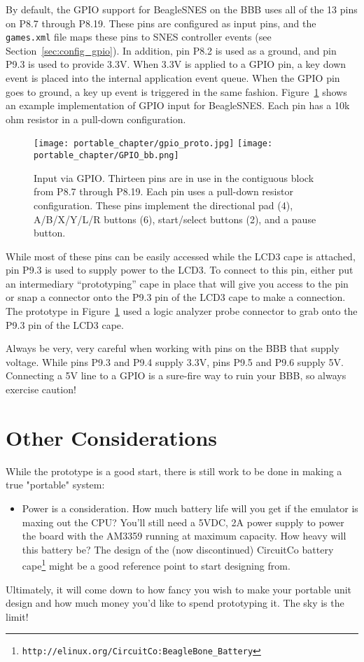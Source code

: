 By default, the GPIO support for BeagleSNES on the BBB uses all of the 13 pins on P8.7 through P8.19.  These pins are configured as input pins, and the \texttt{games.xml} file maps these pins to SNES controller events (see Section~\ref{sec:config_gpio}).  In addition, pin P8.2 is used as a ground, and pin P9.3 is used to provide 3.3V. When 3.3V is applied to a GPIO pin, a key down event is placed into the internal application event queue.  When the GPIO pin goes to ground, a key up event is triggered in the same fashion. Figure~\ref{fig:gpio_proto} shows an example implementation of GPIO input for BeagleSNES.  Each pin has a 10k ohm resistor in a pull-down configuration.

 \begin{figure}[h]
\centering\texttt{[image: portable\_chapter/gpio\_proto.jpg]}
\texttt{[image: portable\_chapter/GPIO\_bb.png]}
\caption{Input via GPIO. Thirteen pins are in use in the contiguous block from P8.7 through P8.19. Each pin uses a pull-down resistor configuration. These pins implement the directional pad (4), A/B/X/Y/L/R buttons (6), start/select buttons (2), and a pause button.}\label{fig:gpio_proto}
\end{figure} 

While most of these pins can be easily accessed while the LCD3 cape is attached, pin P9.3 is used to supply power to the LCD3.  To connect to this pin, either put an intermediary ``prototyping'' cape in place that will give you access to the pin or snap a connector onto the P9.3 pin of the LCD3 cape to make a connection.  The prototype in Figure~\ref{fig:gpio_proto} used a logic analyzer probe connector to grab onto the P9.3 pin of the LCD3 cape.

\begin{updateWarn}
Always be very, very careful when working with pins on the BBB that supply voltage.  While pins P9.3 and P9.4 supply 3.3V, pins P9.5 and P9.6 supply 5V.  Connecting a 5V line to a GPIO is a sure-fire way to ruin your BBB, so always exercise caution!
\end{updateWarn}

\section{Other Considerations}

While the prototype is a good start, there is still work to be done in making a true "portable" system:
\begin{itemize}
\item Power is a consideration.  How much battery life will you get if the emulator is maxing out the CPU?  You'll still need a 5VDC, 2A power supply to power the board with the AM3359 running at maximum capacity.  How heavy will this battery be?  The design of the (now discontinued) CircuitCo battery cape\footnote{\texttt{http://elinux.org/CircuitCo:BeagleBone\_Battery}} might be a good reference point to start designing from.
\end{itemize}
Ultimately, it will come down to how fancy you wish to make your portable unit design and how much money you'd like to spend prototyping it.  The sky is the limit!